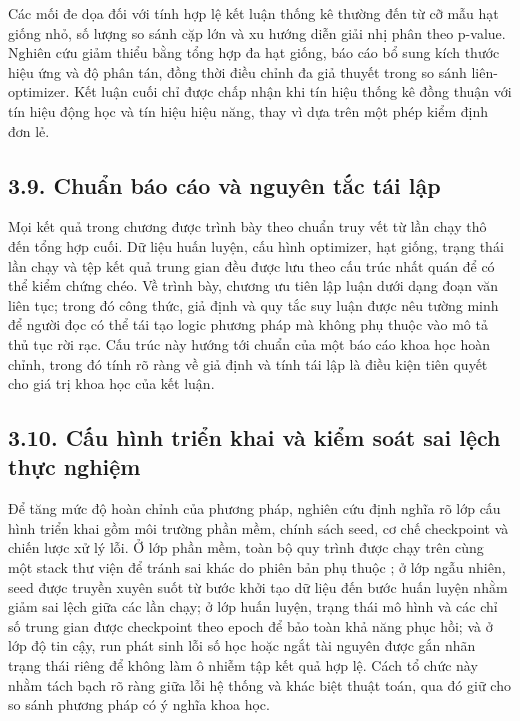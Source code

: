 \documentclass[a4paper,12pt]{article}
\begin{document}
Các mối đe dọa đối với tính hợp lệ kết luận thống kê thường đến từ cỡ mẫu hạt giống nhỏ, số lượng so sánh cặp lớn và xu hướng diễn giải nhị phân theo p-value. Nghiên cứu giảm thiểu bằng tổng hợp đa hạt giống, báo cáo bổ sung kích thước hiệu ứng và độ phân tán, đồng thời điều chỉnh đa giả thuyết trong so sánh liên-optimizer. Kết luận cuối chỉ được chấp nhận khi tín hiệu thống kê đồng thuận với tín hiệu động học và tín hiệu hiệu năng, thay vì dựa trên một phép kiểm định đơn lẻ.

\subsection{3.9. Chuẩn báo cáo và nguyên tắc tái lập}

Mọi kết quả trong chương được trình bày theo chuẩn truy vết từ lần chạy thô đến tổng hợp cuối. Dữ liệu huấn luyện, cấu hình optimizer, hạt giống, trạng thái lần chạy và tệp kết quả trung gian đều được lưu theo cấu trúc nhất quán để có thể kiểm chứng chéo. Về trình bày, chương ưu tiên lập luận dưới dạng đoạn văn liên tục; trong đó công thức, giả định và quy tắc suy luận được nêu tường minh để người đọc có thể tái tạo logic phương pháp mà không phụ thuộc vào mô tả thủ tục rời rạc. Cấu trúc này hướng tới chuẩn của một báo cáo khoa học hoàn chỉnh, trong đó tính rõ ràng về giả định và tính tái lập là điều kiện tiên quyết cho giá trị khoa học của kết luận.

\subsection{3.10. Cấu hình triển khai và kiểm soát sai lệch thực nghiệm}

Để tăng mức độ hoàn chỉnh của phương pháp, nghiên cứu định nghĩa rõ lớp cấu hình triển khai gồm môi trường phần mềm, chính sách seed, cơ chế checkpoint và chiến lược xử lý lỗi. Ở lớp phần mềm, toàn bộ quy trình được chạy trên cùng một stack thư viện để tránh sai khác do phiên bản phụ thuộc \cite{ref16}; ở lớp ngẫu nhiên, seed được truyền xuyên suốt từ bước khởi tạo dữ liệu đến bước huấn luyện nhằm giảm sai lệch giữa các lần chạy; ở lớp huấn luyện, trạng thái mô hình và các chỉ số trung gian được checkpoint theo epoch để bảo toàn khả năng phục hồi; và ở lớp độ tin cậy, run phát sinh lỗi số học hoặc ngắt tài nguyên được gắn nhãn trạng thái riêng để không làm ô nhiễm tập kết quả hợp lệ. Cách tổ chức này nhằm tách bạch rõ ràng giữa lỗi hệ thống và khác biệt thuật toán, qua đó giữ cho so sánh phương pháp có ý nghĩa khoa học.
\end{document}

